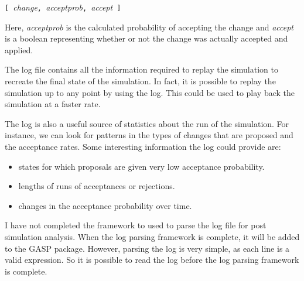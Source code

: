 \begin{indent}
\texttt{[ }\emph{change}\texttt{, }\emph{acceptprob}\texttt{,
}\emph{accept}\texttt{ ]}
\end{indent}

\noindent Here, \emph{acceptprob} is the calculated probability of
accepting the change and \emph{accept} is a boolean representing
whether or not the change was actually accepted and applied.

The log file contains all the information required to replay the
simulation to recreate the final state of the simulation.  In fact, it
is possible to replay the simulation up to any point by using the
log.  This could be used to play back the simulation at a faster rate.

The log is also a useful source of statistics about the run of the
simulation.  For instance, we can look for patterns in the types of
changes that are proposed and the acceptance rates.  Some interesting
information the log could provide are:

\begin{itemize}
\item states for which proposals are given very low acceptance
probability.
\item lengths of runs of acceptances or rejections.
\item changes in the acceptance probability over time.
\end{itemize}

I have not completed the framework to used to parse the log file for
post simulation analysis.  When the log parsing framework is complete,
it will be added to the GASP package.  However, parsing the log is
very simple, as each line is a valid \GAP{} expression.  So it is
possible to read the log before the log parsing framework is complete.
